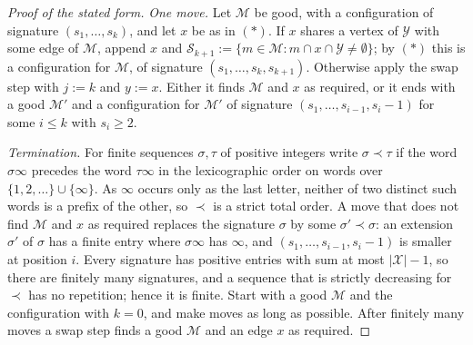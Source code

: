 \begin{proof}[Proof of the stated form]
\emph{One move.} Let $\mathcal M$ be good, with a configuration of signature
$(s_1,\dots,s_k)$, and let $x$ be as in $(*)$. If $x$ shares a vertex of
$\mathcal Y$ with some edge of $\mathcal M$, append $x$ and
$\mathcal S_{k+1}:=\{m\in\mathcal M:m\cap x\cap\mathcal Y\ne\emptyset\}$; by
$(*)$ this is a configuration for $\mathcal M$, of signature
$(s_1,\dots,s_k,s_{k+1})$. Otherwise apply the swap step with $j:=k$ and
$y:=x$. Either it finds $\mathcal M$ and $x$ as required, or it ends with a
good $\mathcal M'$ and a configuration for $\mathcal M'$ of signature
$(s_1,\dots,s_{i-1},s_i-1)$ for some $i\le k$ with $s_i\ge2$.

\emph{Termination.} For finite sequences $\sigma,\tau$ of positive integers
write $\sigma\prec\tau$ if the word $\sigma\infty$ precedes the word
$\tau\infty$ in the lexicographic order on words over
$\{1,2,\dots\}\cup\{\infty\}$. As $\infty$ occurs only as the last letter,
neither of two distinct such words is a prefix of the other, so $\prec$ is a
strict total order. A move that does not find $\mathcal M$ and $x$ as required
replaces the signature $\sigma$
by some $\sigma'\prec\sigma$: an extension $\sigma'$ of $\sigma$ has a finite
entry where $\sigma\infty$ has $\infty$, and $(s_1,\dots,s_{i-1},s_i-1)$ is
smaller at position $i$. Every signature has positive entries with sum at most
$|\mathcal X|-1$, so there are finitely many signatures, and a sequence that
is strictly decreasing for $\prec$ has no repetition; hence it is finite.
Start with a good $\mathcal M$ and the configuration with $k=0$, and make
moves as long as possible. After finitely many moves a swap step finds a good
$\mathcal M$ and an edge $x$ as required.
\end{proof}


